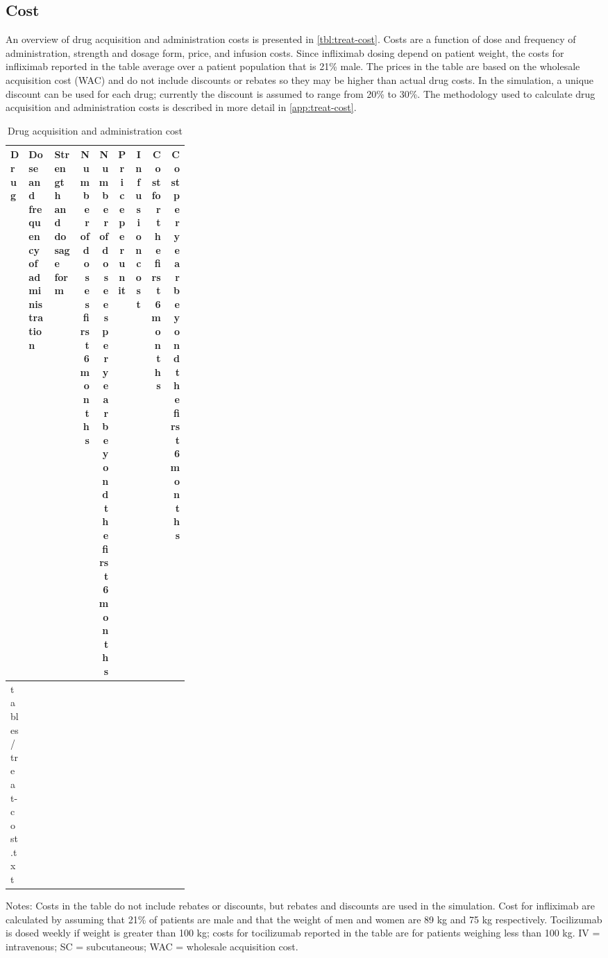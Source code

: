 \documentclass[11pt,final,fleqn]{article}\usepackage[]{graphicx}\usepackage[]{color}
\makeatletter
\theoremstyle{plain}
\newcommand*\ExpandableInput[1]{\@@input#1 }
\makeatother
\begin{document}
\FloatBarrier

\subsection{Cost}\label{cost}


An overview of drug acquisition and administration costs is presented in \autoref{tbl:treat-cost}. Costs are a function of dose and frequency of administration, strength and dosage form, price, and infusion costs. Since infliximab dosing depend on patient weight, the costs for infliximab reported in the table average over a patient population that is 21\% male. The prices in the table are based on the wholesale acquisition cost (WAC) and do not include discounts or rebates so they may be higher than actual drug costs. In the simulation, a unique discount can be used for each drug; currently the discount is assumed to range from 20\% to 30\%. The methodology used to calculate drug acquisition and administration costs is described in more detail in \autoref{app:treat-cost}. 

\begin{table}
\begin{center}
\begin{threeparttable}
\caption{Drug acquisition and administration cost} \label{tbl:treat-cost}
\scriptsize
\begin{tabular}{lp{0.15\linewidth}p{0.15\linewidth}rrrrrr}
\hline
\multicolumn{1}{l}{Drug} &
\multicolumn{1}{p{0.15\linewidth}}{Dose and frequency of administration} & 
\multicolumn{1}{p{0.15\linewidth}}{Strength and dosage form} & 
\multicolumn{1}{p{0.08\linewidth}}{Number of doses first 6 months}  & 
\multicolumn{1}{p{0.08\linewidth}}{Number of dosees per year beyond the first 6 months} & 
\multicolumn{1}{c}{Price per unit} & \multicolumn{1}{c}{Infusion cost} & 
\multicolumn{1}{p{0.08\linewidth}}{Cost for the first 6 months} &
\multicolumn{1}{p{0.08\linewidth}}{Cost per year beyond the first 6 months}\\
\hline
\ExpandableInput{tables/treat-cost.txt}
\hline
\end{tabular}
\tiny
Notes: Costs in the table do not include rebates or discounts, but rebates and discounts are used in the simulation. Cost for infliximab are calculated by assuming that 21\% of patients are male and that the weight of men and women are 89 kg and 75 kg respectively. Tocilizumab is dosed weekly if weight is greater than 100 kg; costs for tocilizumab reported in the table are for patients weighing less than 100 kg. IV = intravenous; SC = subcutaneous; WAC = wholesale acquisition cost. 
\end{threeparttable}
\end{center}
\end{table}
\end{document}
